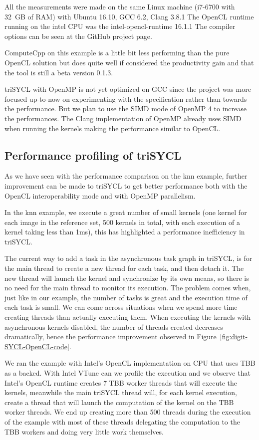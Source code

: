 \documentclass[sigplan, review, authordraft]{acmart}
\begin{document}
All the measurements were made on the same Linux machine (i7-6700
with 32~GB of RAM) with Ubuntu 16.10, GCC 6.2, Clang 3.8.1
The OpenCL runtime running on the intel CPU was the intel-opencl-runtime 16.1.1
The compiler options can be seen at the GitHub project page.

ComputeCpp on this example is a little bit less performing than the
pure OpenCL solution but does quite well if considered the
productivity gain and that the tool is still a beta version 0.1.3.

triSYCL with OpenMP is not yet optimized on GCC since the project was more
focused up-to-now on experimenting with the specification rather than
towards the performance. But we plan to use the SIMD mode of OpenMP 4
to increase the performances. The Clang implementation of OpenMP already
uses SIMD when running the kernels making the performance similar to OpenCL.


\subsection{Performance profiling of triSYCL}
\label{sec:profiling}
As we have seen with the performance comparison on the knn example,
further improvement can be made to triSYCL to get better performance
both with the OpenCL interoperability mode and with OpenMP parallelism.

In the knn example, we execute a great number of small kernels
(one kernel for each image in the reference set, 500 kernels in total,
with each execution of a kernel taking less than 1ms),
this has highlighted a performance inefficiency in triSYCL.

The current way to add a task in the asynchronous task graph in triSYCL,
is for the main thread to create a new thread for each task,
and then detach it. The new thread will launch the kernel and synchronize by
its own means, so there is no need for the main thread to monitor
its execution. The problem comes when, just like in our example,
the number of tasks is great and the execution time of each task is small.
We can come across situations when we spend more time creating threads
than actually executing them. When executing the kernels with asynchronous 
kernels disabled, the number of threads created decreases dramatically, 
hence the performance improvement observed 
in Figure~\ref{fig:digit-SYCL-OpenCL-code}. 

We ran the example with Intel's OpenCL implementation on CPU that uses TBB
as a backed. With Intel VTune can we profile the execution and we observe
that Intel's OpenCL runtime creates 7 TBB worker threads that will execute
the kernels, meanwhile the main triSYCL thread will, for each kernel execution,
create a thread that will launch the computation of the kernel on the
TBB worker threads. We end up creating more than 500 threads during the
execution of the example with most of these threads delegating the computation
to the TBB workers and doing very little work themselves.
\end{document}
